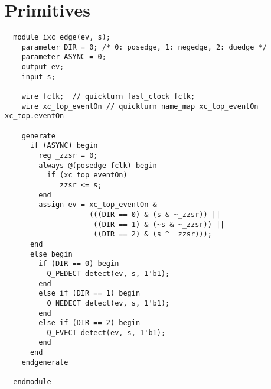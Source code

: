 \documentclass{note}
\begin{document}
\section{Primitives}
\begin{verbatim}
  module ixc_edge(ev, s);
    parameter DIR = 0; /* 0: posedge, 1: negedge, 2: duedge */
    parameter ASYNC = 0;
    output ev;
    input s;

    wire fclk;  // quickturn fast_clock fclk;
    wire xc_top_eventOn // quickturn name_map xc_top_eventOn xc_top.eventOn
    
    generate
      if (ASYNC) begin
        reg _zzsr = 0;
        always @(posedge fclk) begin
          if (xc_top_eventOn) 
            _zzsr <= s;
        end
        assign ev = xc_top_eventOn &
                    (((DIR == 0) & (s & ~_zzsr)) ||          
                     ((DIR == 1) & (~s & ~_zzsr)) ||          
                     ((DIR == 2) & (s ^ _zzsr)));
      end 
      else begin
        if (DIR == 0) begin
          Q_PEDECT detect(ev, s, 1'b1);
        end
        else if (DIR == 1) begin
          Q_NEDECT detect(ev, s, 1'b1);
        end
        else if (DIR == 2) begin
          Q_EVECT detect(ev, s, 1'b1);
        end
      end
    endgenerate
    
  endmodule
\end{verbatim}
\end{document}

